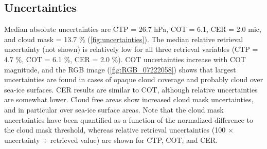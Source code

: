 \subsection{Uncertainties}

Median absolute uncertainties are CTP = 26.7 hPa, COT = 6.1, CER = 2.0 mic, and cloud mask = 13.7 \% (\cref{fig:uncertainties}). The median relative retrieval uncertainty (not shown) is relatively low for all three retrieval variables (CTP = 4.7 \%, COT = 6.1 \%, CER = 2.0 \%). COT uncertainties increase with COT magnitude, and the RGB image (\cref{fig:RGB_07222058}) shows that largest uncertainties are found in cases of opaque cloud coverage and probably cloud over sea-ice surfaces. CER results are similar to COT, although relative uncertainties are somewhat lower. Cloud free areas show increased cloud mask uncertainties, and in particular over sea-ice surface areas. Note that the cloud mask uncertainties have been quantified as a function of the normalized difference to the cloud mask threshold, whereas relative retrieval uncertainties (100 $\times$ uncertainty $\div$ retrieved value) are shown for CTP, COT, and CER. 


